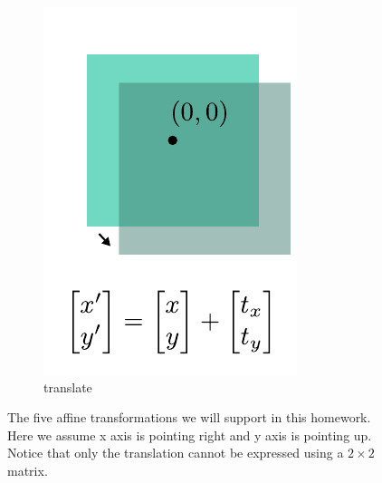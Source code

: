 \begin{figure}[t]
\begin{subfigure}[t]{0.195\linewidth}
        \includegraphics[width=\linewidth]{imgs/translate.pdf}
        \caption{\label{fig:translate} translate}
    \end{subfigure}
    \caption{\label{fig:transformation} The five affine transformations we will support in this homework. Here we assume x axis is pointing right and y axis is pointing up. Notice that only the translation cannot be expressed using a $2 \times 2$ matrix.}
\end{figure}

